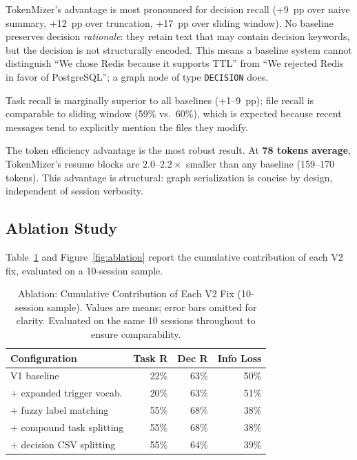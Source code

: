 \documentclass[journal]{IEEEtran}
\begin{document}
TokenMizer's advantage is most pronounced for decision recall
(+9~pp over naive summary, +12~pp over truncation,
+17~pp over sliding window).
No baseline preserves decision \emph{rationale}: they retain
text that may contain decision keywords, but the decision is
not structurally encoded.
This means a baseline system cannot distinguish
``We chose Redis because it supports TTL'' from
``We rejected Redis in favor of PostgreSQL'';
a graph node of type \texttt{DECISION} does.

Task recall is marginally superior to all baselines
(+1--9~pp); file recall is comparable to sliding window
(59\% vs.\ 60\%), which is expected because recent messages
tend to explicitly mention the files they modify.

The token efficiency advantage is the most robust result.
At \textbf{78 tokens average}, TokenMizer's resume blocks are
$2.0$--$2.2\times$ smaller than any baseline (159--170 tokens).
This advantage is structural: graph serialization is concise
by design, independent of session verbosity.

\subsection{Ablation Study}
\label{sec:ablation}

Table~\ref{tab:ablation} and Figure~\ref{fig:ablation}
report the cumulative contribution of each V2 fix, evaluated
on a 10-session sample.

\begin{table}[t]
  \centering
  \caption{Ablation: Cumulative Contribution of Each V2 Fix
  (10-session sample). Values are means; error bars omitted
  for clarity. Evaluated on the same 10 sessions throughout
  to ensure comparability.}
  \label{tab:ablation}
  \renewcommand{\arraystretch}{1.25}
  \begin{tabular}{@{}lrrr@{}}
    \toprule
    \textbf{Configuration} & \textbf{Task R} & \textbf{Dec R}
      & \textbf{Info Loss} \\
    \midrule
    V1 baseline                   & 22\% & 63\% & 50\% \\
    $+$ expanded trigger vocab.   & 20\% & 63\% & 51\% \\
    $+$ fuzzy label matching      & 55\% & 68\% & 38\% \\
    $+$ compound task splitting   & 55\% & 68\% & 38\% \\
    $+$ decision CSV splitting    & 55\% & 64\% & 39\% \\
    \bottomrule
  \end{tabular}
\end{table}
\end{document}
